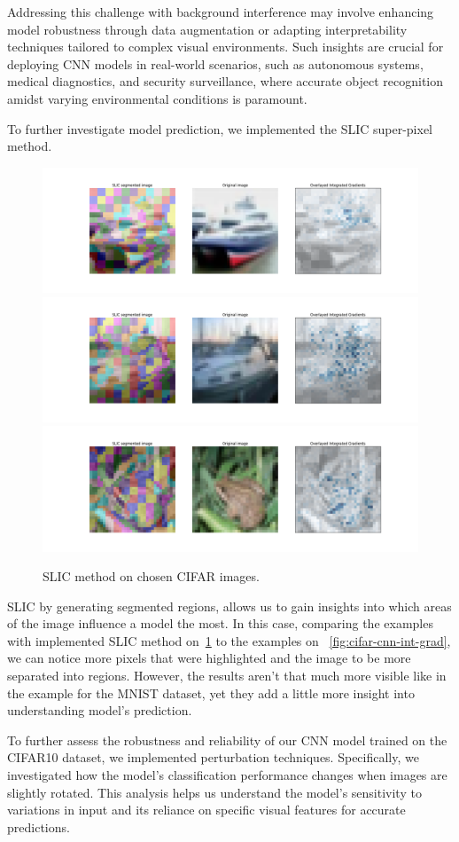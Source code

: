 \documentclass[journal, a4paper]{IEEEtran}
\begin{document}
Addressing this challenge with background interference may involve enhancing model robustness through data augmentation or adapting interpretability techniques tailored to complex visual environments.
Such insights are crucial for deploying CNN models in real-world scenarios, such as autonomous systems, medical diagnostics, and security surveillance, where accurate object recognition amidst varying environmental conditions is paramount.

To further investigate model prediction, we implemented the SLIC super-pixel method.

\begin{figure}[ht]\centering
    \includegraphics[width=.6\linewidth]{img/SLIC/cifar/img_2}
    \includegraphics[width=.6\linewidth]{img/SLIC/cifar/img_3}
    \includegraphics[width=.6\linewidth]{img/SLIC/cifar/img_5}
    \caption{SLIC method on chosen CIFAR images.}\label{fig:cifar-cnn-slic}
\end{figure}

SLIC by generating segmented regions, allows us to gain insights into which areas of the image influence a model the most.
In this case, comparing the examples with implemented SLIC method on~\ref{fig:cifar-cnn-slic} to the examples on ~\ref{fig:cifar-cnn-int-grad}, we can notice more pixels that were highlighted and the image to be more separated into regions.
However, the results aren't that much more visible like in the example for the MNIST dataset, yet they add a little more insight into understanding model's prediction.

To further assess the robustness and reliability of our CNN model trained on the CIFAR10 dataset, we implemented perturbation techniques.
Specifically, we investigated how the model's classification performance changes when images are slightly rotated.
This analysis helps us understand the model's sensitivity to variations in input and its reliance on specific visual features for accurate predictions.
\end{document}
